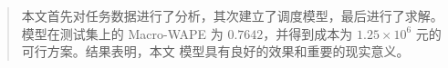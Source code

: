 \begin{abstract}
本文首先对任务数据进行了分析，其次建立了调度模型，最后进行了求解。模型在测试集上的
Macro-WAPE 为 $0.7642$，并得到成本为 $1.25\times 10^6$ 元的可行方案。结果表明，本文
模型具有良好的效果和重要的现实意义。

\end{abstract}

